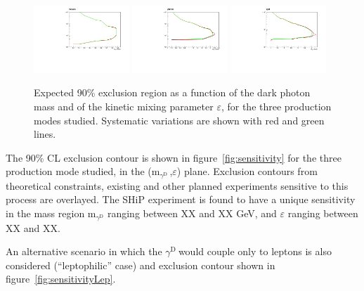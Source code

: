 \documentclass[12pt,a4paper,]{article}
\newcommand{\mathDP}{\gamma^{\mathrm{D}}\ }
\newcommand{\DP}{$\mathDP$}
\newcommand{\mDP}{m$_{\mathDP}$}
\begin{document}
\begin{figure}[h!]
  \centering
  \includegraphics[width=0.32\textwidth]{figures/Limitvsmass_meson.pdf}
  \hfill
  \includegraphics[width=0.32\textwidth]{figures/Limitvsmass_pbrem.pdf}
  \hfill
  \includegraphics[width=0.32\textwidth]{figures/Limitvsmass_qcd.pdf}
\caption{Expected 90\% exclusion region as a function of the dark
  photon mass and of the kinetic mixing parameter $\varepsilon$, for
  the three production modes studied. Systematic variations are shown
  with red and green lines.}
\label{fig:sensSysts}
\end{figure}


The 90\% CL exclusion contour is shown in figure~\ref{fig:sensitivity}
for the three production mode studied, in the (\mDP,$\varepsilon$)
plane. Exclusion contours from theoretical constraints, existing and
other planned experiments sensitive to this process are overlayed. The
SHiP experiment is found to have a unique sensitivity in the mass
region m$_{\gamma^{\mathrm{D}}}$ ranging between XX and XX GeV, and
$\varepsilon$ ranging between XX and XX.

An alternative scenario in which the \DP would couple only to leptons
is also considered (``leptophilic'' case) and exclusion contour shown
in figure~\ref{fig:sensitivityLep}.
\end{document}
